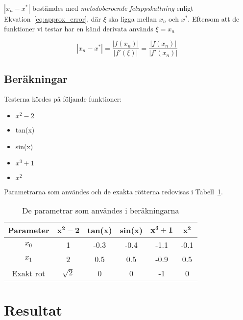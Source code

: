 \documentclass[a4paper,titlepage]{article}
\begin{document}
$|x_n - x^*|$ bestämdes med \textit{metodoberoende feluppskattning} enligt 
Ekvation~\ref{eq:approx_error}, där $\xi$ ska ligga mellan $x_n$ och $x^*$. Eftersom
att de funktioner vi testar har en känd derivata används $\xi = x_n$

\begin{equation}
    |x_n - x^*| = \frac{|f(x_n)|}{|f'(\xi)|} = \frac{|f(x_n)|}{|f'(x_n)|}
    \label{eq:approx_error}
\end{equation}


\subsection{Beräkningar}

Testerna kördes på följande funktioner:

\begin{itemize}
    \item $x^2 - 2$
    \item tan(x)
    \item sin(x)
    \item $x^3 + 1$
    \item $x^2$
\end{itemize}

Parametrarna som användes och de exakta rötterna redovisas i Tabell~\ref{tab:params}.

\begin{table}[h]
    \centering
    \begin{tabular}{c | c | c | c | c | c}
        \textbf{Parameter}  & $\mathbf{x^2 - 2}$    & \textbf{tan(x)}   & \textbf{sin(x)}   & $\mathbf{x^3 + 1}$ & $\mathbf{x^2}$ \\ \hline
        $x_0$               & 1                     & -0.3                & -0.4                   & -1.1 & -0.1 \\
        $x_1$               & 2                     & 0.5                 & 0.5                  & -0.9 & 0.5 \\
        Exakt rot           & $\sqrt{2} $           & 0                  & 0                  & -1 & 0 \\
        
    \end{tabular}
    \caption{De parametrar som användes i beräkningarna}
\label{tab:params}
\end{table}


\section{Resultat}
\end{document}
